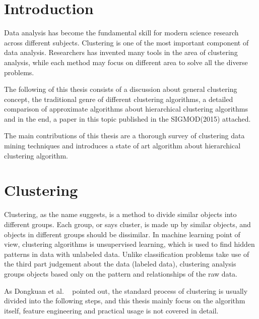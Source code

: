 \documentclass[utf8,english]{gradu3}
\begin{document}
\newtheorem{definition}{Definition}

\mainmatter

\chapter{Introduction}


Data analysis has become the fundamental skill for modern science research across different subjects. Clustering is one of the most important component of data analysis. Researchers has invented many tools in the area of clustering analysis, while each method may focus on different area to solve all the diverse problems. 

The following of this thesis consists of a discussion about general clustering concept, the traditional genre of different clustering algorithms, a detailed comparison of approximate algorithms about hierarchical clustering algorithms and in the end, a paper in this topic  published in the SIGMOD(2015) attached.

The main contributions of this thesis are a thorough survey of clustering data mining techniques and introduces a state of art algorithm about hierarchical clustering algorithm.


\chapter{Clustering}


Clustering, as the name suggests, is a method to divide similar objects into different groups. Each group, or says cluster, is made up by similar objects, and objects in different groups should be dissimilar. In machine learning point of view, clustering algorithms is unsupervised learning, which is used to find hidden patterns in data with unlabeled data. Unlike classification problems take use of the third part judgement about the data (labeled data), clustering analysis groups objects based only on the pattern and relationships of the raw data. 

As Dongkuan et al. ~\cite{xu2015comprehensive} pointed out, the standard process of clustering is usually divided into the following steps, and this thesis mainly focus on the algorithm itself, feature engineering and practical usage is not covered in detail.
\end{document}
